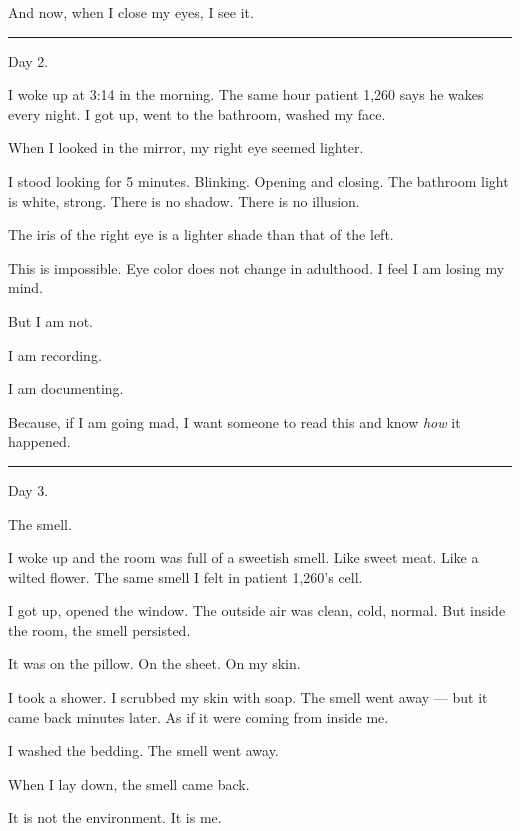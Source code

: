 \noindent And now, when I close my eyes, I see it.

\vspace{0.5em}\noindent\rule{\textwidth}{0.5pt}\vspace{0.5em}

\noindent Day 2.

\noindent I woke up at 3:14 in the morning. The same hour patient 1,260 says he wakes every night. I got up, went to the bathroom, washed my face.

\noindent When I looked in the mirror, my right eye seemed lighter.

\noindent I stood looking for 5 minutes. Blinking. Opening and closing. The bathroom light is white, strong. There is no shadow. There is no illusion.

\noindent The iris of the right eye is a lighter shade than that of the left.

\noindent This is impossible. Eye color does not change in adulthood. I feel I am losing my mind.

\noindent But I am not.

\noindent I am recording.

\noindent I am documenting.

\noindent Because, if I am going mad, I want someone to read this and know \textit{how} it happened.

\vspace{0.5em}\noindent\rule{\textwidth}{0.5pt}\vspace{0.5em}

\noindent Day 3.

\noindent The smell.

\noindent I woke up and the room was full of a sweetish smell. Like sweet meat. Like a wilted flower. The same smell I felt in patient 1,260's cell.

\noindent I got up, opened the window. The outside air was clean, cold, normal. But inside the room, the smell persisted.

\noindent It was on the pillow. On the sheet. On my skin.

\noindent I took a shower. I scrubbed my skin with soap. The smell went away --- but it came back minutes later. As if it were coming from inside me.

\noindent I washed the bedding. The smell went away.

\noindent When I lay down, the smell came back.

\noindent It is not the environment. It is me.

